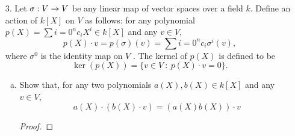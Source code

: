 \begin{itemize}
\begin{enumerate}[(a)]
\begin{proof}
    \end{proof}
    
    \item Prove that $\Hom_{\bbr}(\bbc, V)$ is a complex vector space using part (a) to define scalar multiplication.
    \begin{proof}

    \end{proof}
    
    \item Prove that if $d = \text{dim}_{\bbr}(V) < \infty$, then $\text{dim}_{\bbc}(\Hom_{\bbr}(\bbc, V)) = d$.
    \begin{proof}

    \end{proof}
    
    \item Prove that if $f : V \rar W$ is a linear transformation over $\bbr$, then the
function $f^{*} : \Hom_{\bbr}(\bbc, V) \rar \Hom_{\bbr}(\bbc, W)$ defined by $f^{*}(\phi) = f \circ \phi$ is a linear
transformation over $\bbc$.
    \begin{proof}

    \end{proof}
    
    \item Prove that if $\lambda \in \bbr$ is an eigenvalue for a linear transformation $f : V \rar V$, then $\lambda$ is an eigenvalue for $f^{*} : \Hom_{\bbr}(\bbc, V) \rar \Hom_{\bbr}(\bbc, V)$.
    \begin{proof}

    \end{proof}
\end{enumerate}










\item[3.] Let $\sigma : V \rightarrow V$ be any linear map of vector spaces over a field $k$. Define an action
of $k[X]$ on $V$ as follows: for any polynomial $p(X) = \sum{i=0}^{n} c_i X^i \in k[X]$ and any $v \in V$,
$$p(X) \cdot v = p(\sigma)(v) = \sum{i=0}^{n} c_i \sigma^i(v),$$
where $\sigma^0$ is the identity map on $V$ . The kernel of $p(X)$ is defined to be
$$\ker(p(X)) = \{v \in V \ : \ p(X) \cdot v = 0\}.$$
\begin{enumerate}[(a)]
    \item Show that, for any two polynomials $a(X), b(X) \in k[X]$ and any $v \in V$,
    $$a(X) \cdot (b(X) \cdot v) = (a(X)b(X)) \cdot v$$
    \begin{proof}


\end{proof}
\end{enumerate}
\end{itemize}
